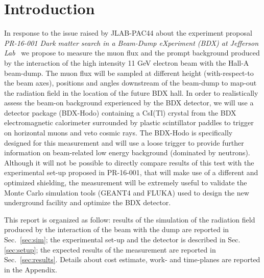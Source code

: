 \documentclass[10pt]{article}
\begin{document}
\newpage
\tableofcontents
\newpage



\section{Introduction}
In response to the issue raised by JLAB-PAC44  about the experiment proposal  {\it PR-16-001 Dark matter search in a Beam-Dump eXperiment (BDX) at Jefferson Lab}~\cite{bdx-proposal} we propose to measure  the muon flux and the prompt  background  produced by the interaction of the high intensity 11 GeV electron beam with the Hall-A beam-dump. The muon   flux will be sampled at different height (with-respect-to the beam axes), positions  and angles downstream of the beam-dump to map-out the radiation field in the location of the  future BDX hall.
In order to realistically assess the beam-on background experienced by the BDX detector, we will use a detector package (BDX-Hodo) containing a CsI(Tl) crystal from the  BDX electromagnetic calorimeter
surrounded by plastic scintillator paddles to trigger on horizontal muons and veto cosmic rays. The BDX-Hodo is specifically designed for this measurement and will use a  loose trigger to provide further information on 
beam-related  low energy background  (dominated by neutrons).
Although it will not be possible to directly compare results of this test with the experimental set-up proposed in PR-16-001, that will make use of a different and  optimized shielding, the measurement will be extremely useful to validate the Monte Carlo simulation tools (GEANT4 and FLUKA) used to design the new underground facility and optimize the BDX detector.

This report is organized as follow: 
results of the simulation of the radiation field produced by the interaction of the beam with the dump  are reported in Sec.~\ref{sec:sim}; the experimental set-up and the detector is described in Sec.\ref{sec:setup}; the expected results of the measurement are reported in Sec.~\ref{sec:results}. Details about cost estimate, work- and time-planes are reported in the Appendix.


\clearpage

\clearpage

\clearpage

\clearpage
\clearpage

\newpage

                                                                              

\end{document}
